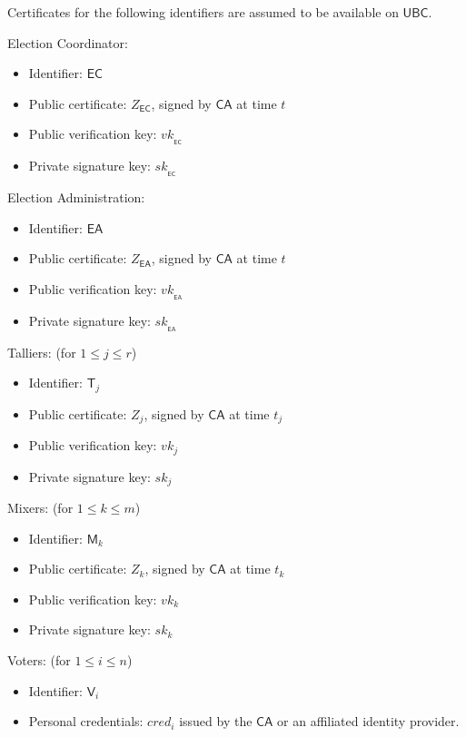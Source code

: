 \documentclass[bibtotoc,halfparskip,oneside]{scrreprt}
\newcommand{\cred}[1]{cred_{#1}\xspace}
\newcommand{\sk}[1]{\mathit{sk}_{#1}\xspace}
\newcommand{\vk}[1]{\mathit{vk}_{#1}\xspace}
\newcommand{\SK}[1]{\sk{_#1}\xspace}
\newcommand{\VK}[1]{\vk{_#1}\xspace}
\newcommand{\CA}{\ensuremath{\mathsf{CA}}\xspace}
\newcommand{\EA}{\ensuremath{\mathsf{EA}}\xspace}
\newcommand{\EC}{\ensuremath{\mathsf{EC}}\xspace}
\newcommand{\UBC}{\ensuremath{\mathsf{UBC}}\xspace}
\newcommand{\Tallier}[1]{\ensuremath{\mathsf{T}_{#1}}\xspace}
\newcommand{\Mixer}[1]{\ensuremath{\mathsf{M}_{#1}}\xspace}
\newcommand{\Voter}[1]{\ensuremath{\mathsf{V}_{#1}}\xspace}
\begin{document}
	
	Certificates for the following identifiers are assumed to be available on \UBC.
	
	
	Election Coordinator:
	\begin{itemize}
		\item Identifier: \EC
		\item Public certificate: $Z_{\EC}$, signed by \CA at time $t$
		\item Public verification key: $\VK{\EC}$ 
		\item Private signature key: $\SK{\EC}$
	\end{itemize}
	
	Election Administration:
	\begin{itemize}
		\item Identifier: \EA
		\item Public certificate: $Z_{\EA}$, signed by \CA at time $t$
		\item Public verification key: $\VK{\EA}$ 
		\item Private signature key: $\SK{\EA}$
	\end{itemize}
	
	Talliers: (for $1\leq j\leq r$)
	\begin{itemize}
		\item Identifier: $\Tallier{j}$
		\item Public certificate: $Z_{j}$, signed by \CA at time $t_j$
		\item Public verification key: $\vk{j}$ 
		\item Private signature key: $\sk{j}$
	\end{itemize}
	
	Mixers: (for $1\leq k\leq m$)
	\begin{itemize}
		\item Identifier: $\Mixer{k}$
		\item Public certificate: $Z_{k}$, signed by \CA at time $t_k$
		\item Public verification key: $\vk{k}$ 
		\item Private signature key: $\sk{k}$
	\end{itemize}
	
	Voters: (for $1\leq i\leq n$)
	\begin{itemize}
		\item Identifier: $\Voter{i}$
		\item Personal credentials: $\cred{i}$ issued by the \CA or an affiliated identity provider.
	\end{itemize}
	
\end{document}
